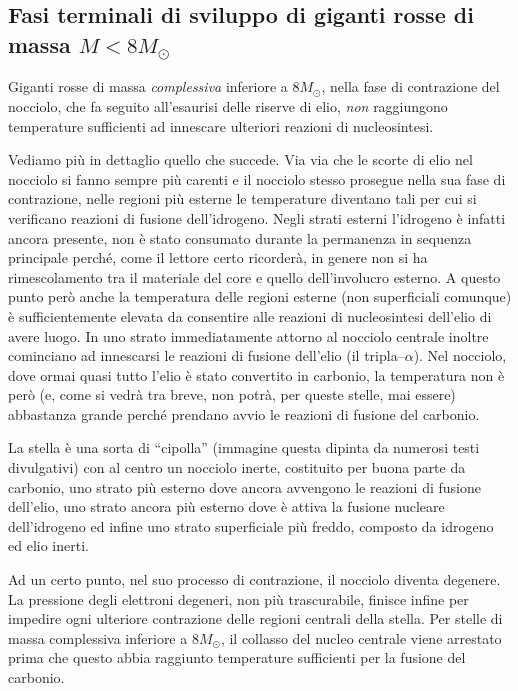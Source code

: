 \subsection{Fasi terminali di sviluppo di giganti rosse di massa $M<8 M_{\odot}$}
Giganti rosse di massa \emph{complessiva} inferiore a $8 M_{\odot}$, nella fase di contrazione del nocciolo, che fa seguito all'esaurisi delle riserve di elio, \emph{non} raggiungono temperature sufficienti ad innescare ulteriori reazioni di nucleosintesi.
\par
Vediamo più in dettaglio quello che succede.
Via via che le scorte di elio nel nocciolo si fanno sempre più carenti e il nocciolo stesso prosegue nella sua fase di contrazione, nelle regioni più esterne le temperature diventano tali per cui si verificano reazioni di fusione dell'idrogeno.
Negli strati esterni l'idrogeno è infatti ancora presente, non è stato consumato durante la permanenza in sequenza principale perch\'{e}, come il lettore certo ricorder\`{a}, in genere non si ha rimescolamento tra il materiale del core e quello dell'involucro esterno. A questo punto però anche la temperatura delle regioni esterne (non superficiali comunque) è sufficientemente elevata da consentire alle reazioni di nucleosintesi dell'elio di avere luogo. In uno strato immediatamente attorno al nocciolo centrale inoltre cominciano ad innescarsi le reazioni di fusione dell'elio (il tripla--$\alpha$). Nel nocciolo, dove ormai quasi tutto l'elio è stato convertito in carbonio, la temperatura non è però (e, come si vedr\`{a} tra breve, non potr\`{a}, per queste stelle, mai essere) abbastanza grande perch\'{e} prendano avvio le reazioni di fusione del carbonio.
\par
La stella è una sorta di ``cipolla'' (immagine questa dipinta da numerosi testi divulgativi) con al centro un nocciolo inerte, costituito per buona parte da carbonio, uno strato più esterno dove ancora avvengono le reazioni di fusione dell'elio, uno strato ancora più esterno dove è attiva la fusione nucleare dell'idrogeno ed infine uno strato superficiale più freddo, composto da idrogeno ed elio inerti.
\par
Ad un certo punto, nel suo processo di contrazione, il nocciolo diventa degenere. La pressione degli elettroni degeneri, non più trascurabile, finisce infine per impedire ogni ulteriore contrazione delle regioni centrali della stella. Per stelle di massa complessiva inferiore a $8 M_{\odot}$, il collasso del nucleo centrale viene arrestato prima che questo abbia raggiunto temperature sufficienti per la fusione del carbonio.
